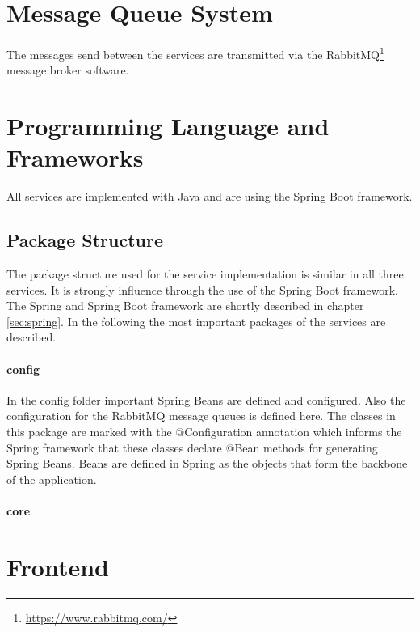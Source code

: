 \section{Message Queue System}
\label{sec:message_queue}
The messages send between the services are transmitted via the RabbitMQ\footnote{\url{https://www.rabbitmq.com/}} message broker software.


\section{Programming Language and Frameworks}
\label{sec:prog_lang_and_framework}
All services are implemented with Java and are using the Spring Boot framework.

\subsection{Package Structure}
\label{sec:folder_structure}
The package structure used for the service implementation is similar in all three services.
It is strongly influence through the use of the Spring Boot framework.
The Spring and Spring Boot framework are shortly described in chapter \ref{sec:spring}.
In the following the most important packages of the services are described.

\paragraph{config}
In the config folder important Spring Beans are defined and configured.
Also the configuration for the RabbitMQ message queues is defined here.
The classes in this package are marked with the @Configuration annotation which informs the Spring framework that these classes declare @Bean methods for generating Spring Beans.
Beans are defined in Spring as the objects that form the backbone of the application.

\paragraph{core}



\section{Frontend}
\label{sec:frontend}
